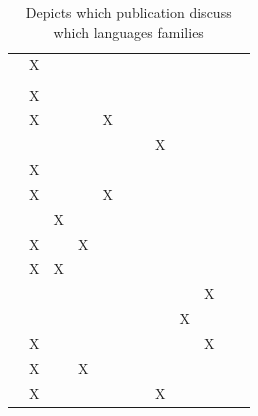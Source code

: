 \documentclass[11pt,a4paper]{book}
\theoremstyle{definition}
\theoremstyle{definition}
\theoremstyle{definition}
\theoremstyle{remark}
\begin{document}
\begin{table}
\begin{tabular}{lp{1cm}p{1cm}p{1cm}p{1cm}p{1cm}p{1cm}p{1.1cm}p{1cm}p{1cm}p{1cm}p{1cm}}
 \cite{aleksandrowicz2017computational}  	& X	& 	& 	& 	& 	& 	& 	& 	& 	& 	\\
 \cite{fenton2017proposed}  	& 	& 	& 	& 	& 	& 	& 	& 	& 	& 	\\
 \cite{lagnado2017causation}  	& X	& 	& 	& 	& 	& 	& 	& 	& 	& 	\\
 \cite{bochman2018actual}  	& X	& 	& 	& X	& 	& 	& 	& 	& 	& 	\\
 \cite{ibeling2018conditional}  	& 	& 	& 	& 	& 	& 	& X	& 	& 	& 	\\
 \cite{beckers2018principled} 	& X	& 	& 	& 	& 	& 	& 	& 	& 	& 	\\
 \cite{bochman2018laws}  	& X	& 	& 	& X	& 	& 	& 	& 	& 	& 	\\
 \cite{denecker2018causal}  	& 	& X	& 	& 	& 	& 	& 	& 	& 	& 	\\
 \cite{batusov2018situation}  	& X	& 	& X	& 	& 	& 	& 	& 	& 	& 	\\
 \cite{denecker2019explaining}  	& X	& X	& 	& 	& 	& 	& 	& 	& 	& 	\\
 \cite{liepicna2019evaluation}  	& 	& 	& 	& 	& 	& 	& 	& 	& X	& 	\\
 \cite{leblanc2019explaining} 	& 	& 	& 	& 	& 	& 	& 	& X	& 	& 	\\
 \cite{liepicna2020arguing} 	& X	& 	& 	& 	& 	& 	& 	& 	& X	& 	\\
 \cite{khannecessary}  	& X	& 	& X	& 	& 	& 	& 	& 	& 	& 	\\
 \cite{ibeling2020probabilistic}  	& X	& 	& 	& 	& 	& 	& X	& 	& 	& 	\\
\bottomrule
\end{tabular}
\caption{Depicts which publication discuss which languages families}
\label{tab:modelling-languages}
\end{table}
\end{document}
